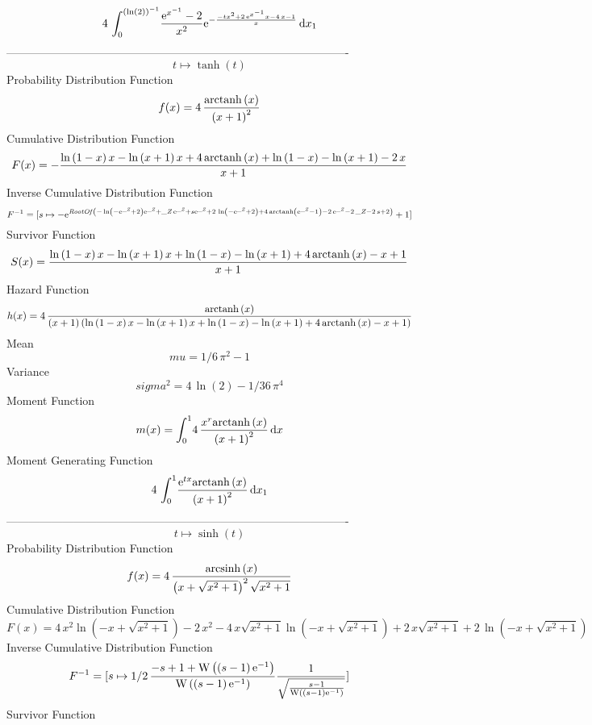 \documentclass[12pt]{article}
\begin{document}
 $$4\,\int_{0}^{ \left( \ln  \left( 2 \right)  \right) ^{-1}}\!{\frac {{
{\rm e}^{{x}^{-1}}}-2}{{x}^{2}}{{\rm e}^{-{\frac {-t{x}^{2}+2\,{
{\rm e}^{{x}^{-1}}}x-4\,x-1}{x}}}}}\,{\rm d}x_{{1}}
$$-------------------------------------------------------------------------------------------  \\$$t\mapsto \tanh \left( t \right) 
$$Probability Distribution Function 
$$  f(x)=4\,{\frac {{\rm arctanh} \left(x\right)}{ \left( x+1 \right) ^{2}}}
$$Cumulative Distribution Function  
 $$F(x)=-{\frac {\ln  \left( 1-x \right) x-\ln  \left( x+1 \right) x+4\,
{\rm arctanh} \left(x\right)+\ln  \left( 1-x \right) -\ln  \left( x+1
 \right) -2\,x}{x+1}}
$$ Inverse Cumulative Distribution Function 
  $$F^{-1} = [s\mapsto -{{\rm e}^{{\it RootOf} \left( -\ln  \left( -{{\rm e}^{{\it 
\_Z}}}+2 \right) {{\rm e}^{{\it \_Z}}}+{\it \_Z}\,{{\rm e}^{{\it \_Z}}
}+s{{\rm e}^{{\it \_Z}}}+2\,\ln  \left( -{{\rm e}^{{\it \_Z}}}+2
 \right) +4\,{\rm arctanh} \left({{\rm e}^{{\it \_Z}}}-1\right)-2\,{
{\rm e}^{{\it \_Z}}}-2\,{\it \_Z}-2\,s+2 \right) }}+1]
$$Survivor Function 
 $$ S(x)={\frac {\ln  \left( 1-x \right) x-\ln  \left( x+1 \right) x+\ln 
 \left( 1-x \right) -\ln  \left( x+1 \right) +4\,{\rm arctanh} \left(x
\right)-x+1}{x+1}}
$$ Hazard Function 
 $$ h(x)=4\,{\frac {{\rm arctanh} \left(x\right)}{ \left( x+1 \right)  \left( 
\ln  \left( 1-x \right) x-\ln  \left( x+1 \right) x+\ln  \left( 1-x
 \right) -\ln  \left( x+1 \right) +4\,{\rm arctanh} \left(x\right)-x+1
 \right) }}
$$Mean 
 $$ mu=1/6\,{\pi}^{2}-1
$$ Variance 
 $$ sigma^2 = 4\,\ln  \left( 2 \right) -1/36\,{\pi}^{4}
$$Moment Function 
 $$ m(x) = \int_{0}^{1}\!4\,{\frac {{x}^{r}{\rm arctanh} \left(x\right)}{ \left( 
x+1 \right) ^{2}}}\,{\rm d}x
$$ Moment Generating Function 
 $$4\,\int_{0}^{1}\!{\frac {{{\rm e}^{tx}}{\rm arctanh} \left(x\right)}{
 \left( x+1 \right) ^{2}}}\,{\rm d}x_{{1}}
$$-------------------------------------------------------------------------------------------  \\$$t\mapsto \sinh \left( t \right) 
$$Probability Distribution Function 
$$  f(x)=4\,{\frac {{\rm arcsinh} \left(x\right)}{ \left( x+\sqrt {{x}^{2}+1}
 \right) ^{2}\sqrt {{x}^{2}+1}}}
$$Cumulative Distribution Function  
 $$F(x)=4\,{x}^{2}\ln  \left( -x+\sqrt {{x}^{2}+1} \right) -2\,{x}^{2}-4\,x
\sqrt {{x}^{2}+1}\ln  \left( -x+\sqrt {{x}^{2}+1} \right) +2\,x\sqrt {
{x}^{2}+1}+2\,\ln  \left( -x+\sqrt {{x}^{2}+1} \right) 
$$ Inverse Cumulative Distribution Function 
  $$F^{-1} = [s\mapsto 1/2\,{\frac {-s+1+{\rm W} \left( \left( s-1 \right) {{\rm e}
^{-1}}\right)}{{\rm W} \left( \left( s-1 \right) {{\rm e}^{-1}}\right)
}{\frac {1}{\sqrt {{\frac {s-1}{{\rm W} \left( \left( s-1 \right) {
{\rm e}^{-1}}\right)}}}}}}]
$$Survivor Function 
\end{document}
